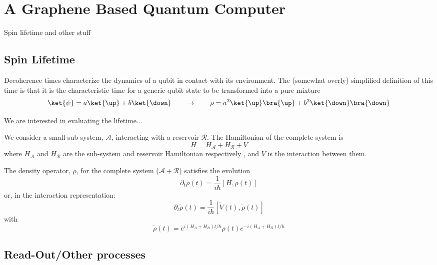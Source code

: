 \chapter{A Graphene Based Quantum Computer}
Spin lifetime and other stuff

\section{Spin Lifetime}

Decoherence times characterize the dynamics of a qubit in contact with its environment. The (somewhat overly) simplified definition of this time is that it is the characteristic time for a generic qubit state
to be transformed into a pure mixture
\begin{equation}
  \ket{\psi}=a\ket{\up}+b\ket{\down} \qquad\rightarrow\qquad
  \rho = a^2\ket{\up}\bra{\up} + b^2\ket{\down}\bra{\down}
\end{equation}


We are interested in evaluating the lifetime...

We consider a small sub-system, $\mathcal{A}$, interacting with a reservoir $\mathcal{R}$. The Hamiltonian of the complete system is
\begin{equation}
  H = H_{\mathcal{A}} + H_{\mathcal{R}} + V
\end{equation}
where $H_{\mathcal{A}}$ and $H_{\mathcal{R}}$ are the sub-system and reservoir Hamiltonian respectively , and $V$ is the interaction between them.

The density operator, $\rho$, for the complete system ($\mathcal{A} + \mathcal{R}$) satisfies the evolution
\begin{equation}
  \partial_t \rho(t) = \frac{1}{i\hbar}\left[H,\rho(t)\right]
\end{equation}
or, in the interaction representation:
\begin{equation}
  \partial_t \tilde{\rho}(t) =
  \frac{1}{i\hbar}\left[\tilde{V}(t),\tilde{\rho}(t)\right]
\end{equation}
with
\begin{equation}
  \tilde{\rho}(t) = e^{i(H_A+H_R)t/\hbar} \rho(t) e^{-i(H_A+H_R)t/\hbar}
\end{equation}



\section{Read-Out/Other processes}
